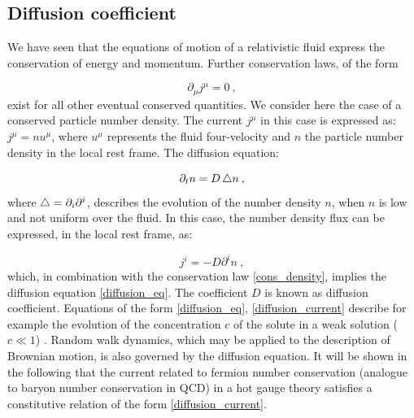  \subsection{Diffusion coefficient}
 
We have seen that the equations of motion of a relativistic fluid express the conservation of energy and momentum. Further conservation laws, of the form
 
 \begin{equation}
 \partial_{\mu} j^{\mu} = 0 \: ,
 \label{cons_density}
 \end{equation}
 exist for all other eventual conserved quantities. We consider here the case of a conserved particle number density. The current $j^{\mu}$ in this case is expressed as: $j^{\mu} = n  u^{\mu}$, where $u^{\mu}$ represents the fluid four-velocity and $n$ the particle number density in the local rest frame. The diffusion equation:
 
 \begin{equation}
 \partial_t n = D \mathop{}\!\mathbin\bigtriangleup n \: ,
 \label{diffusion_eq}
 \end{equation}
 where $\mathop{}\!\mathbin\bigtriangleup = \partial_i \partial^i$, describes the evolution of the number density $n$, when $n$ is low and not uniform over the fluid. In this case, the number density flux can be expressed, in the local rest frame, as:
 
\begin{equation}
j^i = - D \partial^i n \: ,
\label{diffusion_current}
\end{equation}
%
which, in combination with the conservation law \ref{cons_density}, implies the diffusion equation \ref{diffusion_eq}. The coefficient $D$ is known as diffusion coefficient. Equations of the form \ref{diffusion_eq}, \ref{diffusion_current} describe for example the evolution of the concentration $c$ of the solute in a weak solution ($c \ll 1$) \cite{landau2013fluid}. Random walk dynamics, which may be applied to the description of Brownian motion, is also governed by the diffusion equation. It will be shown in the following that the current related to fermion number conservation (analogue to baryon number conservation in QCD) in a hot gauge theory satisfies a constitutive relation of the form \ref{diffusion_current}. 



